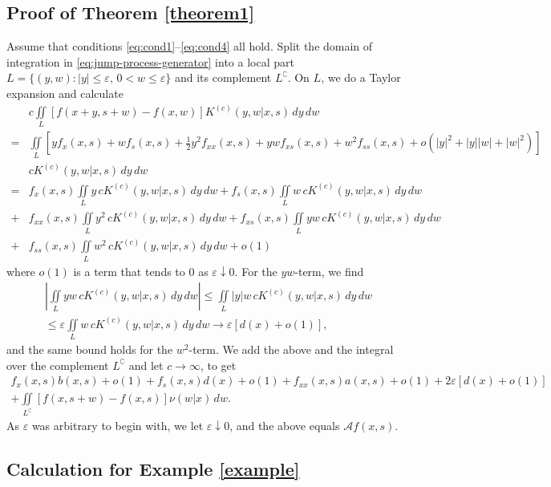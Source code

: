 \documentclass[a4paper,12pt]{article}
\numberwithin{equation}{section}
\theoremstyle{plain}
\theoremstyle{definition}
\theoremstyle{remark}
\numberwithin{equation}{section}
\newcommand{\1}{\mathbf 1}
\begin{document}
\subsection{Proof of Theorem \ref{theorem1}}

Assume that conditions \eqref{eq:cond1}--\eqref{eq:cond4} all hold. 
Split the domain of integration in \eqref{eq:jump-process-generator} into a local part $L = \{(y,w): |y| \le \varepsilon, \, 0 < w \le \varepsilon\}$ and its complement $L^\complement$. On $L$, we do a Taylor expansion and calculate
\begin{align*}
&c \iint\limits_L [f(x+y, s+w) - f(x,w)] K^{(c)}(y,w|x,s)\,dy\,dw
\\
= &\iint\limits_L \left[y f_x(x,s)
+ w f_s(x,s)
+ \frac{1}{2} y^2 f_{xx}(x,s) 
+ yw f_{xs}(x,s) 
+ w^2 f_{ss}(x,s)
+ o(|y|^2 + |y||w| + |w|^2)\right]
\\
& c K^{(c)}(y,w | x,s) \,dy\,dw
\\
= &f_x(x,s) \iint\limits_L y \,cK^{(c)}(y,w|x,s)\,dy\,dw
+ f_s(x,s) \iint\limits_L w \,cK^{(c)}(y,w|x,s)\,dy\,dw
\\
+ &f_{xx}(x,s) \iint\limits_L y^2 \,cK^{(c)}(y,w|x,s)\,dy\,dw
+ f_{xs}(x,s) \iint\limits_L yw \,cK^{(c)}(y,w|x,s)\,dy\,dw
\\
+ &f_{ss}(x,s) \iint\limits_L w^2 \,cK^{(c)}(y,w|x,s)\,dy\,dw
+ o(1)
\end{align*}
where $o(1)$ is a term that tends to $0$ as $\varepsilon \downarrow 0$. 
For the $yw$-term, we find 
\begin{align*}
\left|\iint\limits_L yw \,cK^{(c)}(y,w|x,s)\,dy\,dw \right|
\le \iint\limits_L |y|w \,cK^{(c)}(y,w|x,s)\,dy\,dw
\\
\le \varepsilon \iint\limits_L w \,cK^{(c)}(y,w|x,s)\,dy\,dw
\to \varepsilon [d(x) + o(1)],
\end{align*}
and the same bound holds for the $w^2$-term. 
We add the above and the integral over the complement $L^\complement$ and let $c \to \infty$, to get
\begin{align*}
f_x(x,s) b(x,s) + o(1) + f_s(x,s) d(x) + o(1) + f_{xx}(x,s) a(x,s) + o(1) 
+ 2\varepsilon [d(x) + o(1)]
\\
+ \iint\limits_{L^\complement} [f(x, s+w) - f(x,s)] \nu(w|x)\,dw.
\end{align*}
As $\varepsilon$ was arbitrary to begin with, we let $\varepsilon \downarrow 0$, 
and the above equals $\mathcal A f(x,s)$. 


\subsection{Calculation for Example \ref{example}}
\label{subsec:calc-for-example}
\end{document}
